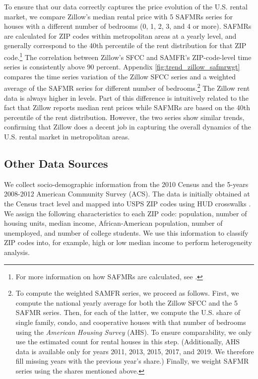 To ensure that our data correctly captures the price evolution of the U.S. rental market, 
we compare Zillow's median rental price with 5 SAFMRs series for houses with a different 
number of bedrooms (0, 1, 2, 3, and 4 or more). SAFMRs are calculated for ZIP codes within 
metropolitan areas at a yearly level, and generally correspond to the 40th percentile of 
the rent distribution for that ZIP code.\footnote{For more information on how SAFMRs are 
	calculated, see \textcite[][page 41641]{hudPreamble}.} 
The correlation between Zillow's SFCC and SAMFR's ZIP-code-level time series is 
consistently above 90 percent. Appendix \autoref{fig:trend_zillow_safmrwgt} compares the 
time series variation of the Zillow SFCC series and a weighted average of the SAFMR series 
for different number of bedrooms.\footnote{	\label{foot:zillow_time_series}
	To compute the weighted SAMFR series, we proceed as follows. First, we compute the 
	national yearly average for both the Zillow SFCC and the 5 SAFMR series. Then, for 
	each of the latter, we compute the U.S. share of single family, condo, and cooperative 
	houses with that number of bedrooms using the \textit{American Housing Survey} (AHS). 
	To ensure comparability, we only use the estimated count for rental houses in this 
	step. (Additionally, AHS data is available only for years 2011, 2013, 2015, 2017, and 
	2019. We therefore fill missing years with the previous year's share.) Finally, we 
	weight SAFMR series using the shares mentioned above.} 
The Zillow rent data is always higher in levels. Part of this difference is intuitively 
related to the fact that Zillow reports median rent prices while SAFMRs are based on the 
40th percentile of the rent distribution. However, the two series show similar trends, 
confirming that Zillow does a decent job in capturing the overall dynamics of the U.S. 
rental market in metropolitan areas.

\subsection{Other Data Sources}\label{sec:data/other_data}

We collect socio-demographic information from the 2010 Census and the 5-years 2008-2012 
American Community Survey (ACS). The data is initially obtained at the Census tract 
level and mapped into USPS ZIP codes using HUD crosswalks \parencite{hudCrosswalks}. We 
assign the following characteristics to each ZIP code: population, number of housing units, 
median income, African-American population, number of unemployed, and number of college 
students. We use this information to classify ZIP codes into, for example, high or low median 
income to perform heterogeneity analysis.

